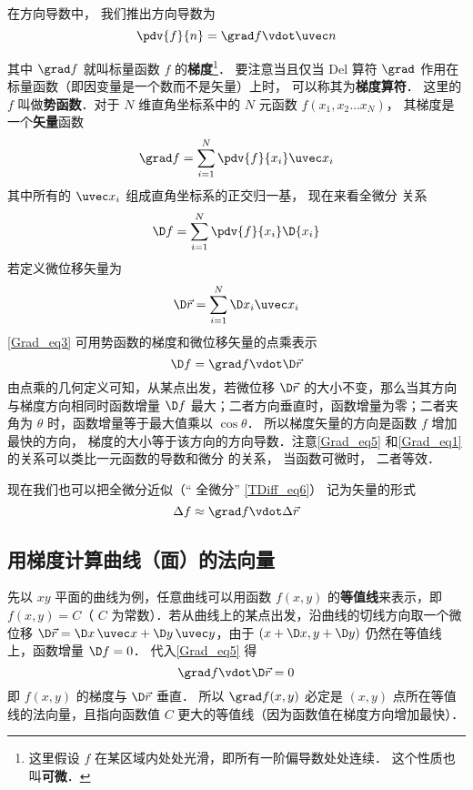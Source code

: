 

在方向导数中， 我们推出方向导数为
\begin{equation}\label{Grad_eq1}
\pdv{f}{n} = \grad f \vdot \uvec n
\end{equation}
 
其中 $\grad f$ 就叫标量函数 $f$ 的\textbf{梯度}\footnote{这里假设 $f$ 在某区域内处处光滑，即所有一阶偏导数处处连续． 这个性质也叫\textbf{可微}．}． 要注意当且仅当 Del 算符 $\grad$ 作用在标量函数（即因变量是一个数而不是矢量）上时， 可以称其为\textbf{梯度算符}． 这里的 $f$ 叫做\textbf{势函数}．对于 $N$ 维直角坐标系中的 $N$ 元函数 $f(x_1,x_2\dots x_N)$， 其梯度是一个\textbf{矢量}函数
\begin{equation}
\grad f = \sum_{i=1}^{N}\pdv{f}{x_i}\uvec x_i
\end{equation}
其中所有的 $\uvec x_i$ 组成直角坐标系的正交归一基， 现在来看全微分 关系
\begin{equation}\label{Grad_eq3}
\D f = \sum\limits_{i = 1}^N \pdv{f}{x_i}\D{x_i}
\end{equation}
若定义微位移矢量为
\begin{equation}
\D \vec r = \sum_{i=1}^{N} \D x_i \uvec x_i
\end{equation}
\autoref{Grad_eq3} 可用势函数的梯度和微位移矢量的点乘表示
\begin{equation}\label{Grad_eq5}
\D f = \grad f \vdot \D \vec r
\end{equation}
由点乘的几何定义可知，从某点出发，若微位移 $\D \vec r$ 的大小不变，那么当其方向与梯度方向相同时函数增量 $\D f$ 最大；二者方向垂直时，函数增量为零；二者夹角为 $\theta$ 时，函数增量等于最大值乘以 $\cos \theta$． 所以梯度矢量的方向是函数 $f$ 增加最快的方向， 梯度的大小等于该方向的方向导数．注意\autoref{Grad_eq5} 和\autoref{Grad_eq1} 的关系可以类比一元函数的导数和微分 的关系， 当函数可微时， 二者等效．

现在我们也可以把全微分近似（“ 全微分” \autoref{TDiff_eq6}） 记为矢量的形式
\begin{equation}\label{Grad_eq6}
\Delta f \approx \grad f \vdot \Delta \vec r
\end{equation}

\subsection{用梯度计算曲线（面）的法向量}
先以 $xy$ 平面的曲线为例，任意曲线可以用函数 $f(x,y)$ 的\textbf{等值线}来表示，即 $f(x,y) = C$（ $C$ 为常数）．若从曲线上的某点出发，沿曲线的切线方向取一个微位移 $\D\vec r = \D x\,\uvec x + \D y\,\uvec y$，由于 $(x+\D x, y+\D y)$ 仍然在等值线上，函数增量 $\D f = 0$． 代入\autoref{Grad_eq5} 得
\begin{equation}
\grad f \vdot \D \vec r = 0
\end{equation}
即 $f(x,y)$ 的梯度与 $\D\vec r$ 垂直． 所以 $\grad f(x,y)$ 必定是 $(x,y)$ 点所在等值线的法向量，且指向函数值 $C$ 更大的等值线（因为函数值在梯度方向增加最快）．

